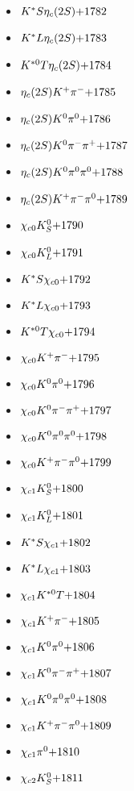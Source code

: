 \begin{multicols}{3}
\begin{itemize}
 \item $ K^{*}S \eta_{c}(2S) \hfill{+1782}$
 \item $ K^{*}L \eta_{c}(2S) \hfill{+1783}$
 \item $ K^{*0}T \eta_{c}(2S) \hfill{+1784}$
 \item $ \eta_{c}(2S) K^{+} \pi^{-} \hfill{+1785}$
 \item $ \eta_{c}(2S) K^{0} \pi^{0} \hfill{+1786}$
 \item $ \eta_{c}(2S) K^{0} \pi^{-} \pi^{+} \hfill{+1787}$
 \item $ \eta_{c}(2S) K^{0} \pi^{0} \pi^{0} \hfill{+1788}$
 \item $ \eta_{c}(2S) K^{+} \pi^{-} \pi^{0} \hfill{+1789}$
 \item $ \chi_{c0} K_{S}^{0} \hfill{+1790}$
 \item $ \chi_{c0} K_{L}^{0} \hfill{+1791}$
 \item $ K^{*}S \chi_{c0} \hfill{+1792}$
 \item $ K^{*}L \chi_{c0} \hfill{+1793}$
 \item $ K^{*0}T \chi_{c0} \hfill{+1794}$
 \item $ \chi_{c0} K^{+} \pi^{-} \hfill{+1795}$
 \item $ \chi_{c0} K^{0} \pi^{0} \hfill{+1796}$
 \item $ \chi_{c0} K^{0} \pi^{-} \pi^{+} \hfill{+1797}$
 \item $ \chi_{c0} K^{0} \pi^{0} \pi^{0} \hfill{+1798}$
 \item $ \chi_{c0} K^{+} \pi^{-} \pi^{0} \hfill{+1799}$
 \item $ \chi_{c1} K_{S}^{0} \hfill{+1800}$
 \item $ \chi_{c1} K_{L}^{0} \hfill{+1801}$
 \item $ K^{*}S \chi_{c1} \hfill{+1802}$
 \item $ K^{*}L \chi_{c1} \hfill{+1803}$
 \item $ \chi_{c1} K^{*0}T \hfill{+1804}$
 \item $ \chi_{c1} K^{+} \pi^{-} \hfill{+1805}$
 \item $ \chi_{c1} K^{0} \pi^{0} \hfill{+1806}$
 \item $ \chi_{c1} K^{0} \pi^{-} \pi^{+} \hfill{+1807}$
 \item $ \chi_{c1} K^{0} \pi^{0} \pi^{0} \hfill{+1808}$
 \item $ \chi_{c1} K^{+} \pi^{-} \pi^{0} \hfill{+1809}$
 \item $ \chi_{c1} \pi^{0} \hfill{+1810}$
 \item $ \chi_{c2} K_{S}^{0} \hfill{+1811}$

\end{itemize}
\end{multicols}
